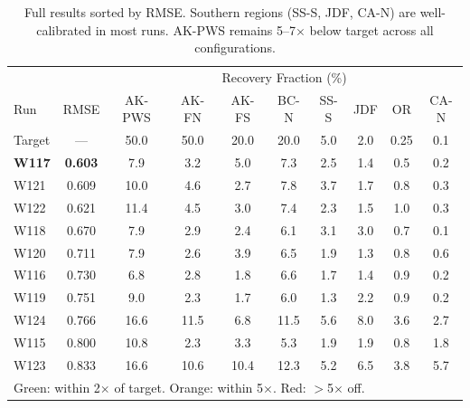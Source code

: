 \documentclass[11pt]{article}
\begin{document}
\begin{table}[H]
\centering
\small
\begin{tabular}{lc|cccccccc}
\toprule
& & \multicolumn{8}{c}{Recovery Fraction (\%)} \\
Run & RMSE & AK-PWS & AK-FN & AK-FS & BC-N & SS-S & JDF & OR & CA-N \\
\midrule
Target & --- & 50.0 & 50.0 & 20.0 & 20.0 & 5.0 & 2.0 & 0.25 & 0.1 \\
\midrule
\textbf{W117} & \textbf{0.603} & 7.9 & 3.2 & 5.0 & 7.3 & \textcolor{good}{2.5} & \textcolor{good}{1.4} & 0.5 & \textcolor{good}{0.2} \\
W121 & 0.609 & 10.0 & 4.6 & 2.7 & 7.8 & \textcolor{good}{3.7} & \textcolor{good}{1.7} & 0.8 & \textcolor{good}{0.3} \\
W122 & 0.621 & 11.4 & 4.5 & 3.0 & 7.4 & \textcolor{good}{2.3} & \textcolor{good}{1.5} & 1.0 & \textcolor{good}{0.3} \\
W118 & 0.670 & 7.9 & 2.9 & 2.4 & 6.1 & \textcolor{good}{3.1} & 3.0 & 0.7 & \textcolor{good}{0.1} \\
W120 & 0.711 & 7.9 & 2.6 & 3.9 & 6.5 & \textcolor{good}{1.9} & \textcolor{good}{1.3} & 0.8 & 0.6 \\
W116 & 0.730 & 6.8 & 2.8 & 1.8 & 6.6 & \textcolor{good}{1.7} & \textcolor{good}{1.4} & 0.9 & \textcolor{good}{0.2} \\
W119 & 0.751 & 9.0 & 2.3 & 1.7 & 6.0 & \textcolor{good}{1.3} & 2.2 & 0.9 & \textcolor{good}{0.2} \\
W124 & 0.766 & 16.6 & 11.5 & 6.8 & 11.5 & \textcolor{ok}{5.6} & \textcolor{bad}{8.0} & \textcolor{bad}{3.6} & \textcolor{bad}{2.7} \\
W115 & 0.800 & 10.8 & 2.3 & 3.3 & 5.3 & \textcolor{good}{1.9} & \textcolor{good}{1.9} & 0.8 & \textcolor{bad}{1.8} \\
W123 & 0.833 & \textcolor{ok}{16.6} & 10.6 & 10.4 & 12.3 & \textcolor{good}{5.2} & \textcolor{bad}{6.5} & \textcolor{bad}{3.8} & \textcolor{bad}{5.7} \\
\midrule
\multicolumn{10}{l}{\footnotesize \textcolor{good}{Green}: within 2$\times$ of target. \textcolor{ok}{Orange}: within 5$\times$. \textcolor{bad}{Red}: $>$5$\times$ off.} \\
\bottomrule
\end{tabular}
\caption{Full results sorted by RMSE. Southern regions (SS-S, JDF, CA-N) are well-calibrated in most runs. AK-PWS remains 5--7$\times$ below target across all configurations.}
\end{table}
\end{document}

